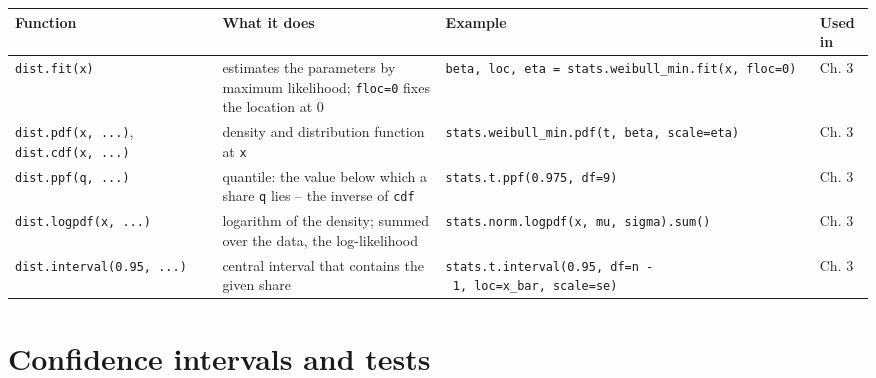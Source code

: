 \documentclass[
  letterpaper,
  DIV=11,
  numbers=noendperiod]{scrreprt}
\begin{document}
\begin{longtable}[]{@{}
  >{\raggedright\arraybackslash}p{}
  >{\raggedright\arraybackslash}p{}
  >{\raggedright\arraybackslash}p{}
  >{\raggedright\arraybackslash}p{}@{}}
\toprule\noalign{}
\begin{minipage}[b]{\linewidth}\raggedright
Function
\end{minipage} & \begin{minipage}[b]{\linewidth}\raggedright
What it does
\end{minipage} & \begin{minipage}[b]{\linewidth}\raggedright
Example
\end{minipage} & \begin{minipage}[b]{\linewidth}\raggedright
Used in
\end{minipage} \\
\midrule\noalign{}
\endhead
\bottomrule\noalign{}
\endlastfoot
\texttt{dist.fit(x)} & estimates the parameters by maximum likelihood;
\texttt{floc=0} fixes the location at 0 &
\texttt{beta,\ loc,\ eta\ =\ stats.weibull\_min.fit(x,\ floc=0)} & Ch.
3 \\
\texttt{dist.pdf(x,\ ...)}, \texttt{dist.cdf(x,\ ...)} & density and
distribution function at \texttt{x} &
\texttt{stats.weibull\_min.pdf(t,\ beta,\ scale=eta)} & Ch. 3 \\
\texttt{dist.ppf(q,\ ...)} & quantile: the value below which a share
\texttt{q} lies -- the inverse of \texttt{cdf} &
\texttt{stats.t.ppf(0.975,\ df=9)} & Ch. 3 \\
\texttt{dist.logpdf(x,\ ...)} & logarithm of the density; summed over
the data, the log-likelihood &
\texttt{stats.norm.logpdf(x,\ mu,\ sigma).sum()} & Ch. 3 \\
\texttt{dist.interval(0.95,\ ...)} & central interval that contains the
given share &
\texttt{stats.t.interval(0.95,\ df=n\ -\ 1,\ loc=x\_bar,\ scale=se)} &
Ch. 3 \\
\end{longtable}

\section{Confidence intervals and
tests}\label{confidence-intervals-and-tests}
\end{document}

